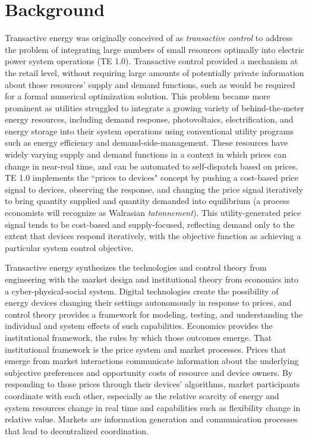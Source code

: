 \documentclass[10pt,twocolumn]{article}
\begin{document}
\section{Background}

Transactive energy was originally conceived of as \textit{transactive control} to address the problem of integrating large numbers of small resources optimally into electric power system operations (TE 1.0). Transactive control provided a mechanism at the retail level, without requiring large amounts of potentially private information about those resources' supply and demand functions, such as would be required for a formal numerical optimization solution.  This problem became more prominent as utilities struggled to integrate a growing variety of behind-the-meter energy resources, including demand response, photovoltaics, electrification, and energy storage into their system operations using conventional utility programs such as energy efficiency and demand-side-management. These resources have widely varying supply and demand functions in a context in which prices can change in near-real time, and can be automated to self-dispatch based on prices. TE 1.0 implements the ``prices to devices" concept by pushing a cost-based price signal to devices, observing the response, and changing the price signal iteratively to bring quantity supplied and quantity demanded into equilibrium (a process economists will recognize as Walrasian \emph{tatonnement}). This utility-generated price signal tends to be cost-based and supply-focused, reflecting demand only to the extent that devices respond iteratively, with the objective function as achieving a particular system control objective.

Transactive energy synthesizes the technologies and control theory from engineering with the market design and institutional theory from economics into a cyber-physical-social system. Digital technologies create the possibility of energy devices changing their settings autonomously in response to prices, and control theory provides a framework for modeling, testing, and understanding the individual and system effects of such capabilities. Economics provides the institutional framework, the rules by which those outcomes emerge. That institutional framework is the price system and market processes. Prices that emerge from market interactions communicate information about the underlying subjective preferences and opportunity costs of resource and device owners. By responding to those prices through their devices' algorithms, market participants coordinate with each other, especially as the relative scarcity of energy and system resources change in real time and capabilities such as flexibility change in relative value. Markets are information generation and communication processes that lead to decentralized coordination.
\end{document}
